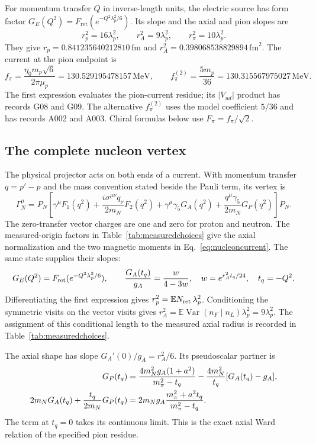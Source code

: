 \documentclass[aps,prx,onecolumn,10pt,notitlepage,nofootinbib,longbibliography]{revtex4-2}
\numberwithin{equation}{section}
\numberwithin{table}{section}
\newcommand{\EE}{\mathbb E}
\newcommand{\Var}{\operatorname{Var}}
\newcommand{\MeV}{\,\mathrm{MeV}}
\newcommand{\fm}{\,\mathrm{fm}}
\newcommand{\lamP}{\lambda_p}
\newcommand{\Fret}{F_{\mathrm{ret}}}
\begin{document}
For momentum transfer $Q$ in inverse-length units, the electric source has form factor $G_E(Q^2)=\Fret(e^{-Q^2\lamP^2/6})$. Its slope and the axial and pion slopes are
\begin{equation}
 r_p^2=16\lamP^2,\qquad r_A^2=9\lamP^2,\qquad
 r_\pi^2=10\lamP^2.
\end{equation}
They give $r_p=0.841235640212810\fm$ and $r_A^2=0.398068538829894\,\mathrm{fm}^2$. The current at the pion endpoint is
\begin{equation}
 f_\pi=\frac{\eta_0 m_p\sqrt6}{2\pi\mu_p}=130.529195478157\MeV,
 \qquad f_\pi^{(2)}=\frac{5m_p}{36}=130.315567975027\MeV.
 \label{eq:fpi}
\end{equation}
The first expression evaluates the pion-current residue; its $|V_{ud}|$ product has records G08 and G09. The alternative $f_\pi^{(2)}$ uses the model coefficient $5/36$ and has records A002 and A003. Chiral formulas below use $F_\pi=f_\pi/\sqrt2$.

\subsection{The complete nucleon vertex}
\label{sec:nucleonvertex}
The physical projector acts on both ends of a current. With momentum transfer
$q=p'-p$ and the mass convention stated beside the Pauli term, its vertex is
\begin{equation}
 \Gamma_N^\mu=P_N\left[
 \gamma^\mu F_1(q^2)+\frac{i\sigma^{\mu\nu}q_\nu}{2m_N}F_2(q^2)
 +\gamma^\mu\gamma_5G_A(q^2)
 +\frac{q^\mu\gamma_5}{2m_N}G_P(q^2)\right]P_N.
 \label{eq:nucleonvertex}
\end{equation}
The zero-transfer vector charges are one and zero for proton and neutron.
The measured-origin factors in Table~\ref{tab:measuredchoices} give the axial
normalization and the two magnetic moments in Eq.~\eqref{eq:nucleoncurrent}.
The same state supplies their slopes:
\begin{equation}
 G_E(Q^2)=F_{\rm ret}(e^{-Q^2\lambda_p^2/6}),\qquad
 \frac{G_A(t_q)}{g_A}=\frac{w}{4-3w},\quad w=e^{r_A^2t_q/24},\quad t_q=-Q^2.
 \label{eq:nucleonslopes}
\end{equation}
Differentiating the first expression gives $r_p^2=\EE N_{\rm ret}\,\lambda_p^2$.
Conditioning the symmetric visits on the vector visits gives
$r_A^2=\EE\Var(n_F\mid n_L)\lambda_p^2=9\lambda_p^2$.
The assignment of this conditional length to the measured axial radius is
recorded in Table~\ref{tab:measuredchoices}.

The axial shape has slope $G_A'(0)/g_A=r_A^2/6$. Its pseudoscalar partner is
\begin{align}
 G_P(t_q)&=\frac{4m_N^2g_A(1+a^2)}{m_\pi^2-t_q}
 -\frac{4m_N^2}{t_q}[G_A(t_q)-g_A],\notag\\
 2m_NG_A(t_q)+\frac{t_q}{2m_N}G_P(t_q)
 &=2m_Ng_A\frac{m_\pi^2+a^2t_q}{m_\pi^2-t_q}.
 \label{eq:axialward}
\end{align}
The term at $t_q=0$ takes its continuous limit. This is the exact axial
Ward relation of the specified pion residue.
\end{document}

